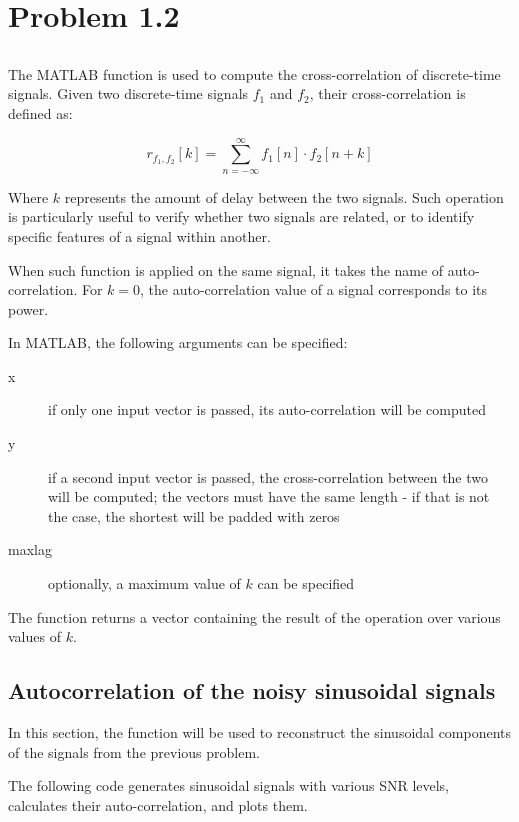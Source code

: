 \section{Problem 1.2}

\subsection{}
The MATLAB function  is used to compute the cross-correlation of discrete-time signals.
Given two discrete-time signals $f_1$ and $f_2$, their cross-correlation is defined as:

\begin{equation}
	r_{f_1, f_2}[k] = \sum_{n=-\infty}^{\infty}f_1[n] \cdot f_2[n+k]
\end{equation}

Where $k$ represents the amount of delay between the two signals.
Such operation is particularly useful to verify whether two signals are related, or to identify specific features of a signal within another.

When such function is applied on the same signal, it takes the name of auto-correlation.
For $k=0$, the auto-correlation value of a signal corresponds to its power.

In MATLAB, the following arguments can be specified:
\begin{description}
	\item[x] if only one input vector is passed, its auto-correlation will be computed
	\item[y] if a second input vector is passed, the cross-correlation between the two will be computed; the vectors must have the same length - if that is not the case, the shortest will be padded with zeros
	\item[maxlag] optionally, a maximum value of $k$ can be specified
\end{description}

The function returns a vector containing the result of the operation over various values of $k$.


\subsection{Autocorrelation of the noisy sinusoidal signals}
In this section, the  function will be used to reconstruct the sinusoidal components of the signals from the previous problem.

The following code generates sinusoidal signals with various SNR levels, calculates their auto-correlation, and plots them.

